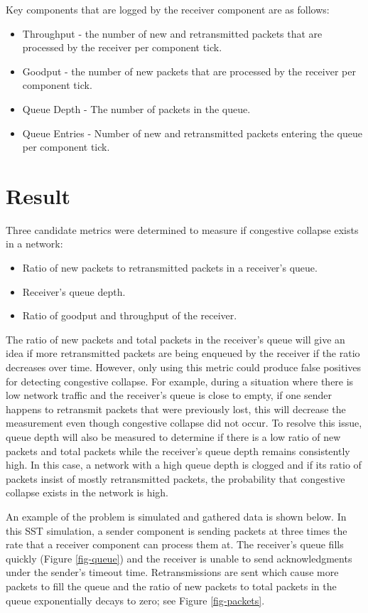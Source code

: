 \documentclass{article}
\begin{document}
Key components that are logged by the receiver component are as follows:

\begin{itemize}
	\item Throughput - the number of new and retransmitted packets that are processed by the receiver per component tick.
	\item Goodput - the number of new packets that are processed by the receiver per component tick.
	\item Queue Depth - The number of packets in the queue.
	\item Queue Entries - Number of new and retransmitted packets entering the queue per component tick.
\end{itemize}


\section{Result} %

Three candidate metrics were determined to measure if congestive collapse exists in a network:

\begin{itemize}
	\item Ratio of new packets to retransmitted packets in a receiver's queue.
	\item Receiver's queue depth.
	\item Ratio of goodput and throughput of the receiver.
\end{itemize}

The ratio of new packets and total packets in the receiver's queue will give an idea if more retransmitted packets are being enqueued by the receiver if the ratio decreases over time. However, only using this metric could produce false positives for detecting congestive collapse. For example, during a situation where there is low network traffic and the receiver's queue is close to empty, if one sender happens to retransmit packets that were previously lost, this will decrease the measurement even though congestive collapse did not occur.
To resolve this issue, queue depth will also be measured to determine if there is a low ratio of new packets and total packets while the receiver's queue depth remains consistently high. In this case, a network with a high queue depth is clogged and if its ratio of packets insist of mostly retransmitted packets, the probability that congestive collapse exists in the network is high.

An example of the problem is simulated and gathered data is shown below. In this SST simulation, a sender component is sending packets at three times the rate that a receiver component can process them at. The receiver's queue fills quickly (Figure \ref{fig-queue}) and the receiver is unable to send acknowledgments under the sender's timeout time. Retransmissions are sent which cause more packets to fill the queue and the ratio of new packets to total packets in the queue exponentially decays to zero; see Figure \ref{fig-packets}.
\end{document}
